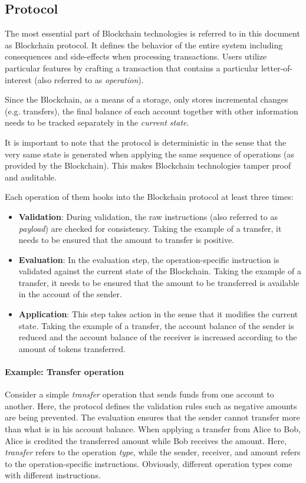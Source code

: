 \subsection{Protocol}
\label{section:architecture:protocol}

The most essential part of Blockchain technologies is referred to in this document as Blockchain protocol. It defines the behavior of the entire system including consequences and side-effects when processing transactions. Users utilize particular features by crafting a transaction that contains a particular letter-of-interest (also referred to as \emph{operation}).

Since the Blockchain, as a means of a storage, only stores incremental changes (e.g. transfers), the final balance of each account together with other information needs to be tracked separately in the \emph{current state}.

It is important to note that the protocol is deterministic in the sense that the very same state is generated when applying the same sequence of operations (as provided by the Blockchain). This makes Blockchain technologies tamper proof and auditable.

Each operation of them hooks into the Blockchain protocol at least three times:
\begin{itemize}
\item \textbf{Validation}: During validation, the raw instructions (also referred to as \emph{payload}) are checked for consistency. Taking the example of a transfer, it needs to be ensured that the amount to transfer is positive.
\item \textbf{Evaluation}: In the evaluation step, the operation-specific instruction is validated against the current state of the Blockchain. Taking the example of a transfer, it needs to be ensured that the amount to be transferred is available in the account of the sender.
\item \textbf{Application}: This step takes action in the sense that it modifies the current state. Taking the example of a transfer, the account balance of the sender is reduced and the account balance of the receiver is increased according to the amount of tokens transferred.
\end{itemize}

\paragraph{Example: Transfer operation}
Consider a simple \emph{transfer} operation that sends funds from one account to another. Here, the protocol defines the validation rules such as negative amounts are being prevented. The evaluation ensures that the sender cannot transfer more than what is in his account balance. When applying a transfer from Alice to Bob, Alice is credited the transferred amount while Bob receives the amount. Here, \emph{transfer} refers to the operation \emph{type}, while the sender, receiver, and amount refers to the operation-specific instructions. Obviously, different operation types come with different instructions.

